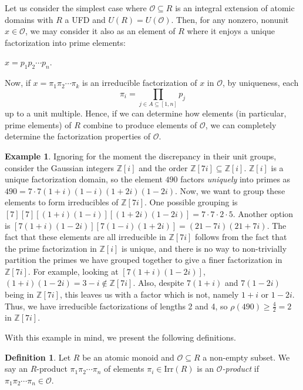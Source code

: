 \documentclass{amsart}
\theoremstyle{definition}
\newtheorem{defn}[lem]{Definition}
\newtheorem{ex}[lem]{Example}
\newcommand{\MO}{\mathcal{O}}
\newcommand{\bbz}{\mathbb{Z}}
\renewcommand{\geq}{\geqslant}
\numberwithin{equation}{section}
\begin{document}
Let us consider the simplest case where $\mathcal{O} \subseteq R$ is an integral extension of atomic domains with $R$ a UFD and $U(R) = U(\MO)$. Then, for any nonzero, nonunit $x \in \mathcal{O}$, we may consider it also as an element of $R$ where it enjoys a unique factorization into prime elements:

\begin{center}
    $x = p_1 p_2 \dotsm p_n$.
\end{center}

Now, if $x = \pi_1 \pi_2 \dotsm \pi_k$ is an irreducible factorization of $x$ in $\mathcal{O}$, by uniqueness, each 
\[
\pi_i = \prod_{j \in A \subseteq [1,n]}p_j
\]
\noindent up to a unit multiple. Hence, if we can determine how elements (in particular, prime elements) of $R$ combine to produce elements of $\mathcal{O}$, we can completely determine the factorization properties of $\mathcal{O}$. 

\begin{ex}
    Ignoring for the moment the discrepancy in their unit groups, consider the Gaussian integers $\bbz[i]$ and the order $\bbz[7i] \subseteq \bbz[i]$. $\bbz[i]$ is a unique factorization domain, so the element $490$ factors \textit{uniquely} into primes as $490 = 7\cdot7 (1+i)(1-i)(1+2i)(1-2i)$. Now, we want to group these elements to form irreducibles of $\bbz[7i]$. One possible grouping is $[7][7][(1+i)(1-i)][(1+2i)(1-2i)] = 7\cdot7\cdot2\cdot5$. Another option is $[7(1+i)(1-2i)][7(1-i)(1+2i)] = (21-7i)(21+7i)$. The fact that these elements are all irreducible in $\bbz[7i]$ follows from the fact that the prime factorization in $\bbz[i]$ is unique, and there is no way to non-trivially partition the primes we have grouped together to give a finer factorization in $\bbz[7i]$. For example, looking at $[7(1+i)(1-2i)]$, $(1+i)(1-2i) = 3 - i \notin \bbz[7i]$. Also, despite $7(1+i)$ and $7(1-2i)$ being in $\bbz[7i]$, this leaves us with a factor which is not, namely $1+i$ or $1-2i$. Thus, we have irreducible factorizations of lengths 2 and 4, so $\rho(490) \geq \frac{4}{2} = 2$ in $\bbz[7i]$. 
\end{ex}

With this example in mind, we present the following definitions. 

\begin{defn}
    Let $R$ be an atomic monoid and $\mathcal{O} \subseteq R$ a non-empty subset. We say an $R$-product $\pi_1 \pi_2 \dotsm \pi_n$ of elements $\pi_i \in \text{Irr}(R)$ is an $\mathcal{O}$\textit{-product} if $\pi_1 \pi_2 \dotsm \pi_n \in \mathcal{O}$.
\end{defn}
\end{document}
